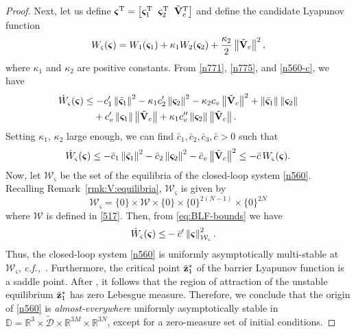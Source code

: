 \begin{proof}
	Next, let us define $\bm{\varsigma}^{\mathrm{T}}=\left[\bm{\varsigma}_1^{\mathrm{T}}\;\;\bm{\varsigma}_2^{\mathrm{T}}\;\;\tilde{\mathbf{V}}_c^{\mathrm{T}}\right]$ and define the candidate Lyapunov function 
	\begin{equation}\label{n780}
	W_\varsigma(\bm{\varsigma})=W_1(\bm{\varsigma}_1)+\kappa_1W_2(\bm{\varsigma}_2)+\frac{\kappa_2}{2}\left\|\tilde{\mathbf{V}}_c\right\|^2,
	\end{equation}
	where $\kappa_1$ and $\kappa_2$ are positive constants.
	From \eqref{n771}, \eqref{n775}, and \eqref{n560-c}, we have
	\begin{equation}\label{n784} \begin{aligned}
	\dot W_\varsigma(\bm{\varsigma}) &\leq -c_1'\left\|\bar{\bm{\varsigma}}_1\right\|^2-\kappa_1c_2'\left\|\bm{\varsigma}_2\right\|^2-\kappa_2c_v\left\|\tilde{\mathbf{V}}_c\right\|^2+\left\|\bar{\bm{\varsigma}}_1\right\|\left\|\bm{\varsigma}_2\right\| \\
	&\quad +c_v'\left\|\bm{\varsigma}_1\right\|\left\|\tilde{\mathbf{V}}_c\right\|+\kappa_1c_v''\left\|\bm{\varsigma}_2\right\|\left\|\tilde{\mathbf{V}}_c\right\|.
	\end{aligned} \end{equation}
	Setting $\kappa_1,\,\kappa_2$ large enough, we can find $\bar{c}_1, \bar{c}_2, \bar{c}_3, \bar{c} > 0$ such that
	\begin{equation}\label{n790}
	\dot W_\varsigma(\bm{\varsigma})\leq -\bar c_1\left\|\bar{\bm{\varsigma}}_1\right\|^2-\bar c_2\left\|\bm{\varsigma}_2\right\|^2-\bar c_v\left\|\tilde{\mathbf{V}}_c\right\|^2
		\leq-\bar c\, W_\varsigma(\bm{\varsigma}).
	\end{equation}
	Now, let $\mathcal{W}_\varsigma$ be the set of the equilibria of the closed-loop system \eqref{n560}.
	Recalling Remark~\ref{rmk:V:equilibria}, $\mathcal{W}_\varsigma$ is given by
	\begin{equation}
	\mathcal{W}_\varsigma = \{0\}\times\mathcal{W}\times\{0\}\times\{0\}^{2(N-1)}\times\{0\}^{2N}
	\end{equation}
	where $\mathcal{W}$ is defined in \eqref{517}. Then, from \eqref{eq:BLF-bounds} we have
	\begin{equation}\label{n799}\begin{aligned}
	\dot W_\varsigma(\bm{\varsigma})\leq& -\bar c'\left\|\bm{\varsigma}\right\|_{\mathcal{W}_\varsigma}^2.
	\end{aligned}\end{equation}
	Thus, the closed-loop system \eqref{n560} is uniformly asymptotically multi-stable at $\mathcal{W}_\varsigma$, \emph{c.f.,}~\cite{forni_cascade_2016}.
	Furthermore, the critical point $\tilde{\mathbf{z}}_1^*$ of the barrier Lyapunov function is a saddle point.
	After \cite[Proposition~1]{monzon2006local}, it follows that the region of attraction of the unstable equilibrium $\tilde{\mathbf{z}}_1^*$ has zero Lebesgue measure. Therefore, we conclude that the origin of \eqref{n560} is {\it almost-everywhere} uniformly asymptotically stable in $\mathbb{D}=\mathbb{R}^3\times\mathcal{\tilde D}\times \mathbb{R}^{3M}\times \mathbb{R}^{3N}$, except for a zero-measure set of initial conditions.
	

\end{proof}
